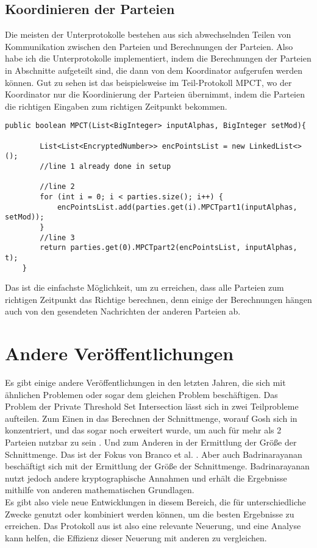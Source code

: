 \subsection{Koordinieren der Parteien}
Die meisten der Unterprotokolle bestehen aus sich abwechselnden Teilen von Kommunikation zwischen den Parteien und Berechnungen der Parteien. Also habe ich die Unterprotokolle implementiert, indem die Berechnungen der Parteien in Abschnitte aufgeteilt sind, die dann von dem Koordinator aufgerufen werden können. Gut zu sehen ist das beispielsweise im Teil-Protokoll MPCT, wo der Koordinator nur die Koordinierung der Parteien übernimmt, indem die Parteien die richtigen Eingaben zum richtigen Zeitpunkt bekommen.\\

\begin{lstlisting}[caption = Ausschnitt der Implementierung von MPCT (vereinfacht)]
public boolean MPCT(List<BigInteger> inputAlphas, BigInteger setMod){

        List<List<EncryptedNumber>> encPointsList = new LinkedList<>();
        //line 1 already done in setup

        //line 2
        for (int i = 0; i < parties.size(); i++) {
            encPointsList.add(parties.get(i).MPCTpart1(inputAlphas, setMod));
        }
        //line 3
        return parties.get(0).MPCTpart2(encPointsList, inputAlphas, t);
    }

\end{lstlisting}

Das ist die einfachste Möglichkeit, um zu erreichen, dass alle Parteien zum richtigen Zeitpunkt das Richtige berechnen, denn einige der Berechnungen hängen auch von den gesendeten Nachrichten der anderen Parteien ab.\\

\section{Andere Veröffentlichungen}
Es gibt einige andere Veröffentlichungen in den letzten Jahren, die sich mit ähnlichen Problemen oder sogar dem gleichen Problem beschäftigen.
Das Problem der Private Threshold Set Intersection lässt sich in zwei Teilprobleme aufteilen. Zum Einen in das Berechnen der Schnittmenge, worauf Gosh sich in \cite{Ghosh2019} konzentriert, und das sogar noch erweitert wurde, um auch für mehr als 2 Parteien nutzbar zu sein \cite{Doettling2021}. Und zum Anderen in der Ermittlung der Größe der Schnittmenge. Das ist der Fokus von Branco et al.  \cite{Doettling2021}. Aber auch Badrinarayanan \cite{cryptoeprint:2020:600} beschäftigt sich mit der Ermittlung der Größe der Schnittmenge. Badrinarayanan nutzt jedoch andere kryptographische Annahmen und erhält die Ergebnisse mithilfe von anderen mathematischen Grundlagen. \cite{Doettling2021}\\
Es gibt also viele neue Entwicklungen in diesem Bereich, die für unterschiedliche Zwecke genutzt oder kombiniert werden können, um die besten Ergebnisse zu erreichen. Das Protokoll aus \cite{Doettling2021} ist also eine relevante Neuerung, und eine Analyse kann helfen, die Effizienz dieser Neuerung mit anderen zu vergleichen.
